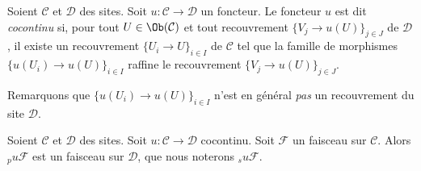 \begin{definition}
\label{definition-cocontinuous}
Soient $\mathcal{C}$ et $\mathcal{D}$ des sites.
Soit $u : \mathcal{C} \to \mathcal{D}$ un foncteur.
Le foncteur $u$ est dit {\it cocontinu} si, pour tout
$U \in \Ob(\mathcal{C})$ et tout recouvrement
$\{V_j \to u(U)\}_{j \in J}$ de $\mathcal{D}$, il existe un recouvrement
$\{U_i \to U\}_{i\in I}$ de $\mathcal{C}$ tel que la famille de morphismes
$\{u(U_i) \to u(U)\}_{i \in I}$ raffine le recouvrement
$\{V_j \to u(U)\}_{j \in J}$.
\end{definition}

\noindent
Remarquons que $\{u(U_i) \to u(U)\}_{i \in I}$ n’est en général {\it pas}
un recouvrement du site $\mathcal{D}$.

\begin{lemma}
\label{lemma-pu-sheaf}
Soient $\mathcal{C}$ et $\mathcal{D}$ des sites.
Soit $u : \mathcal{C} \to \mathcal{D}$ cocontinu.
Soit $\mathcal{F}$ un faisceau sur $\mathcal{C}$.
Alors ${}_pu\mathcal{F}$ est un faisceau sur $\mathcal{D}$,
que nous noterons ${}_su\mathcal{F}$.
\end{lemma}

